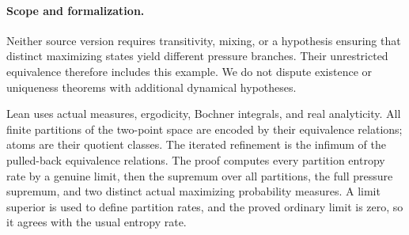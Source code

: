 \documentclass[11pt]{article}
\begin{document}
\paragraph{Scope and formalization.}
Neither source version requires transitivity, mixing, or a hypothesis ensuring that distinct maximizing states yield different pressure branches. Their unrestricted equivalence therefore includes this example. We do not dispute existence or uniqueness theorems with additional dynamical hypotheses.

Lean uses actual measures, ergodicity, Bochner integrals, and real analyticity. All finite partitions of the two-point space are encoded by their equivalence relations; atoms are their quotient classes. The iterated refinement is the infimum of the pulled-back equivalence relations. The proof computes every partition entropy rate by a genuine limit, then the supremum over all partitions, the full pressure supremum, and two distinct actual maximizing probability measures. A limit superior is used to define partition rates, and the proved ordinary limit is zero, so it agrees with the usual entropy rate.
\end{document}
